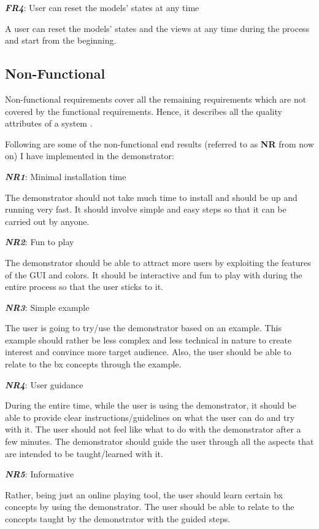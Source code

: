 \textbf{\textit{FR4}}: User can reset the models' states at any time

A user can reset the models' states and the views at any time during the process and start from the beginning.

\subsection{Non-Functional}\label{subsec:nonfunctionalreq}
Non-functional requirements cover all the remaining requirements which are not covered by the functional requirements. Hence, it describes all the quality attributes of a system \cite{funcandnonfuncreq}.

Following are some of the non-functional end results (referred to as \textbf{NR} from now on) I have implemented in the demonstrator:

\textbf{\textit{NR1}}: Minimal installation time

The demonstrator should not take much time to install and should be up and running very fast. It should involve simple and easy steps so that it can be carried out by anyone.

\textbf{\textit{NR2}}: Fun to play

The demonstrator should be able to attract more users by exploiting the features of the GUI and colors. It should be interactive and fun to play with during the entire process so that the user sticks to it.

\textbf{\textit{NR3}}: Simple example

The user is going to try/use the demonstrator based on an example. This example should rather be less complex and less technical in nature to create interest and convince more target audience. Also, the user should be able to relate to the bx concepts through the example.

\textbf{\textit{NR4}}: User guidance

During the entire time, while the user is using the demonstrator, it should be able to provide clear instructions/guidelines on what the user can do and try with it. The user should not feel like what to do with the demonstrator after a few minutes. The demonstrator should guide the user through all the aspects that are intended to be taught/learned with it.

\textbf{\textit{NR5}}: Informative

Rather, being just an online playing tool, the user should learn certain bx concepts by using the demonstrator. The user should be able to relate to the concepts taught by the demonstrator with the guided steps.

